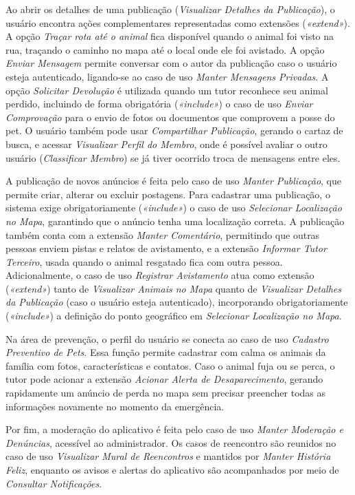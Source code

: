 Ao abrir os detalhes de uma publicação (\textit{Visualizar Detalhes da Publicação}), o usuário encontra ações complementares representadas como extensões (\textit{«extend»}). A opção \textit{Traçar rota até o animal} fica disponível quando o animal foi visto na rua, traçando o caminho no mapa até o local onde ele foi avistado. A opção \textit{Enviar Mensagem} permite conversar com o autor da publicação caso o usuário esteja autenticado, ligando-se ao caso de uso \textit{Manter Mensagens Privadas}. A opção \textit{Solicitar Devolução} é utilizada quando um tutor reconhece seu animal perdido, incluindo de forma obrigatória (\textit{«include»}) o caso de uso \textit{Enviar Comprovação} para o envio de fotos ou documentos que comprovem a posse do pet. O usuário também pode usar \textit{Compartilhar Publicação}, gerando o cartaz de busca, e acessar \textit{Visualizar Perfil do Membro}, onde é possível avaliar o outro usuário (\textit{Classificar Membro}) se já tiver ocorrido troca de mensagens entre eles.

A publicação de novos anúncios é feita pelo caso de uso \textit{Manter Publicação}, que permite criar, alterar ou excluir postagens. Para cadastrar uma publicação, o sistema exige obrigatoriamente (\textit{«include»}) o caso de uso \textit{Selecionar Localização no Mapa}, garantindo que o anúncio tenha uma localização correta. A publicação também conta com a extensão \textit{Manter Comentário}, permitindo que outras pessoas enviem pistas e relatos de avistamento, e a extensão \textit{Informar Tutor Terceiro}, usada quando o animal resgatado fica com outra pessoa. Adicionalmente, o caso de uso \textit{Registrar Avistamento} atua como extensão (\textit{«extend»}) tanto de \textit{Visualizar Animais no Mapa} quanto de \textit{Visualizar Detalhes da Publicação} (caso o usuário esteja autenticado), incorporando obrigatoriamente (\textit{«include»}) a definição do ponto geográfico em \textit{Selecionar Localização no Mapa}.

Na área de prevenção, o perfil do usuário se conecta ao caso de uso \textit{Cadastro Preventivo de Pets}. Essa função permite cadastrar com calma os animais da família com fotos, características e contatos. Caso o animal fuja ou se perca, o tutor pode acionar a extensão \textit{Acionar Alerta de Desaparecimento}, gerando rapidamente um anúncio de perda no mapa sem precisar preencher todas as informações novamente no momento da emergência.

Por fim, a moderação do aplicativo é feita pelo caso de uso \textit{Manter Moderação e Denúncias}, acessível ao administrador. Os casos de reencontro são reunidos no caso de uso \textit{Visualizar Mural de Reencontros} e mantidos por \textit{Manter História Feliz}, enquanto os avisos e alertas do aplicativo são acompanhados por meio de \textit{Consultar Notificações}.

